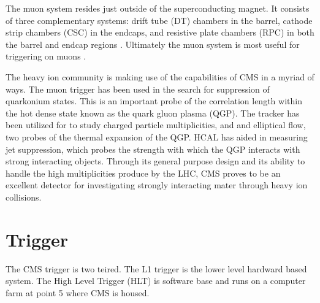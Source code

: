 The muon system resides just outside of the superconducting magnet.
It consists of three complementary systems: drift tube (DT) chambers in the
	barrel, cathode strip chambers (CSC) in the endcaps, and resistive 
	plate chambers (RPC) in both the barrel and endcap regions \cite{tCmsE}.
Ultimately the muon system is most useful for triggering on muons \cite{tCmsE}.

The heavy ion community is making use of the capabilities of CMS in a myriad of
	ways.
The muon trigger has been used in the search for suppression of quarkonium 
	states. 
This is an important probe of the correlation length within the hot dense state
	known as the quark gluon plasma (QGP).
The tracker has been utilized for to study charged particle multiplicities, and
	and elliptical flow, two probes of the thermal expansion of the QGP.
HCAL has aided in measuring jet suppression, which probes the strength with 
	which the QGP interacts with strong interacting objects.
Through its general purpose design and its ability to handle the high
	multiplicities produce by the LHC, CMS proves to be an excellent 
	detector for investigating strongly interacting mater through heavy ion
	collisions. 
  \section{Trigger}
    The CMS trigger is two teired. 
    The L1 trigger is the lower level hardward based system. 
    The High Level Trigger (HLT) is software base and runs on a computer farm
      at point 5 where CMS is housed. 
